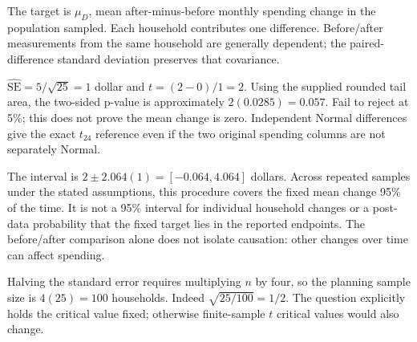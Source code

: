 \documentclass[11pt]{article}
\begin{document}
\begin{parts}
\item The target is $\mu_D$, mean after-minus-before monthly spending change in the population sampled. Each household contributes one difference. Before/after measurements from the same household are generally dependent; the paired-difference standard deviation preserves that covariance.
\item $\widehat{\mathrm{SE}}=5/\sqrt{25}=1$ dollar and $t=(2-0)/1=2$. Using the supplied rounded tail area, the two-sided p-value is approximately $2(0.0285)=0.057$. Fail to reject at 5\%; this does not prove the mean change is zero. Independent Normal differences give the exact $t_{24}$ reference even if the two original spending columns are not separately Normal.
\item The interval is $2\pm2.064(1)=[-0.064,4.064]$ dollars. Across repeated samples under the stated assumptions, this procedure covers the fixed mean change 95\% of the time. It is not a 95\% interval for individual household changes or a post-data probability that the fixed target lies in the reported endpoints. The before/after comparison alone does not isolate causation: other changes over time can affect spending.
\item Halving the standard error requires multiplying $n$ by four, so the planning sample size is $4(25)=100$ households. Indeed $\sqrt{25/100}=1/2$. The question explicitly holds the critical value fixed; otherwise finite-sample $t$ critical values would also change.
\end{parts}
\end{document}
